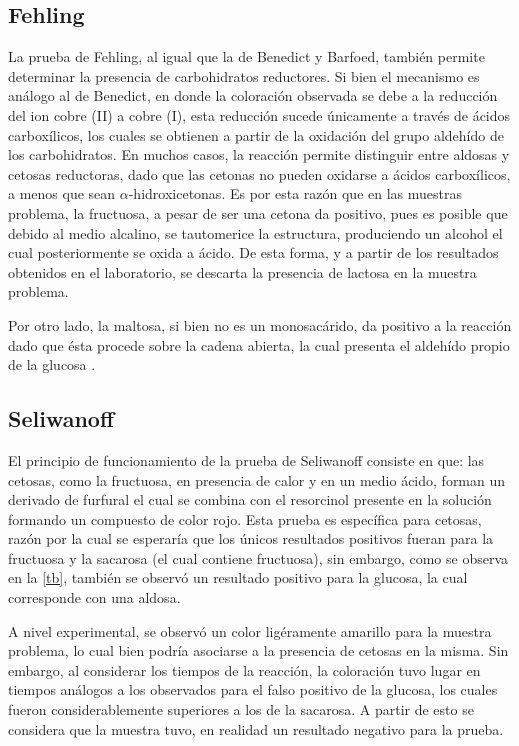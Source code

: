 \documentclass[fleqn,10pt]{SelfArx}
\begin{document}
	\subsection{Fehling}
		La prueba de Fehling, al igual que la de Benedict y Barfoed, tambi\'en permite determinar la presencia de carbohidratos reductores. Si bien el mecanismo es an\'alogo al de Benedict, en donde la coloraci\'on observada se debe a la reducci\'on del ion cobre (II) a cobre (I), esta reducci\'on sucede \'unicamente a trav\'es de \'acidos carbox\'ilicos, los cuales se obtienen a partir de la oxidaci\'on del grupo aldeh\'ido de los carbohidratos. En muchos casos, la reacci\'on permite distinguir entre aldosas y cetosas reductoras, dado que las cetonas no pueden oxidarse a \'acidos carbox\'ilicos, a menos que sean $\alpha$-hidroxicetonas. Es por esta raz\'on que en las muestras problema, la fructuosa, a pesar de ser una cetona da positivo, pues es posible que debido al medio alcalino, se tautomerice la estructura, produciendo un alcohol el cual posteriormente se oxida a \'acido. De esta forma, y a partir de los resultados obtenidos en el laboratorio, se descarta la presencia de lactosa en la muestra problema.
		
		Por otro lado, la maltosa, si bien no es un monosac\'arido, da positivo a la reacci\'on dado que \'esta procede sobre la cadena abierta, la cual presenta el aldeh\'ido propio de la glucosa \cite{ouellette2015principles}.
	
	\subsection{Seliwanoff}
		El principio de funcionamiento de la prueba de Seliwanoff consiste en que: las cetosas, como la fructuosa, en presencia de calor y en un medio ácido, forman un derivado de furfural el cual se combina con el resorcinol presente en la soluci\'on formando un compuesto de color rojo. Esta prueba es espec\'ifica para cetosas, raz\'on por la cual se esperar\'ia que los \'unicos resultados positivos fueran para la fructuosa y la sacarosa (el cual contiene fructuosa), sin embargo, como se observa en la \autoref{tb}, tambi\'en se observ\'o un resultado positivo para la glucosa, la cual corresponde con una aldosa. 
		
		A nivel experimental, se observ\'o un color lig\'eramente amarillo para la muestra problema, lo cual bien podr\'ia asociarse a la presencia de cetosas en la misma. Sin embargo, al considerar los tiempos de la reacci\'on, la coloraci\'on tuvo lugar en tiempos an\'alogos a los observados para el falso positivo de la glucosa, los cuales fueron considerablemente superiores a los de la sacarosa. A partir de esto se considera que la muestra tuvo, en realidad un resultado negativo para la prueba.
		
\end{document}
